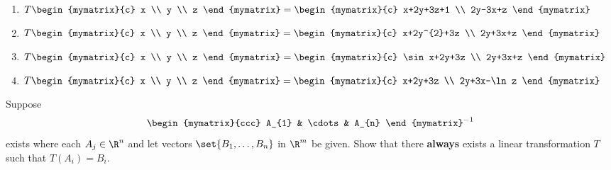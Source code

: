\begin{enumialphparenastyle}
\begin{ex}
\begin{enumerate}
\item $T\begin{mymatrix}{c}
x \\
y \\
z
\end{mymatrix} =\begin{mymatrix}{c}
x+2y+3z+1 \\
2y-3x+z
\end{mymatrix} $

\item $T\begin{mymatrix}{c}
x \\
y \\
z
\end{mymatrix} =\begin{mymatrix}{c}
x+2y^{2}+3z \\
2y+3x+z
\end{mymatrix} $

\item $T\begin{mymatrix}{c}
x \\
y \\
z
\end{mymatrix} =\begin{mymatrix}{c}
\sin x+2y+3z \\
2y+3x+z
\end{mymatrix} $

\item $T\begin{mymatrix}{c}
x \\
y \\
z
\end{mymatrix} =\begin{mymatrix}{c}
x+2y+3z \\
2y+3x-\ln z
\end{mymatrix} $
\end{enumerate}
\end{ex}


\begin{ex} Suppose 
\begin{equation*}
\begin{mymatrix}{ccc}
A_{1} & \cdots & A_{n}
\end{mymatrix} ^{-1}
\end{equation*}
 exists where each $A_{j}\in \R^{n}$ and let
vectors  $\set{B_{1},\ldots,B_{n}} $ in $\R^{m}$ be given. 
Show that there \textbf{always }exists a linear
transformation $T$ such that $T(A_{i})=B_{i}$.
\end{ex}



\end{enumialphparenastyle}

